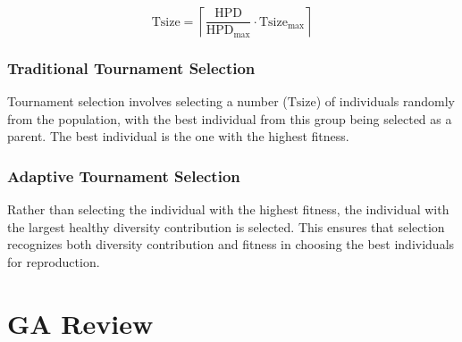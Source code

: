 \documentclass[../main.tex]{subfiles}
\begin{document}
\begin{equation}
\text{Tsize} = \left\lceil \frac{\text{HPD}}{\text{HPD}_\text{max}} \cdot \text{Tsize}_\text{max} \right\rceil
\end{equation}

\subsubsection{Traditional Tournament Selection}

Tournament selection involves selecting a number ($\text{Tsize}$) of individuals randomly from the population, with the
best individual from this group being selected as a parent. The best individual is the one with the highest fitness.

\subsubsection{Adaptive Tournament Selection} Rather than selecting the individual with the highest fitness, the individual
with the largest healthy diversity contribution is selected. This ensures that selection recognizes both diversity
contribution and fitness in choosing the best individuals for reproduction.

\section{GA Review}
\end{document}
